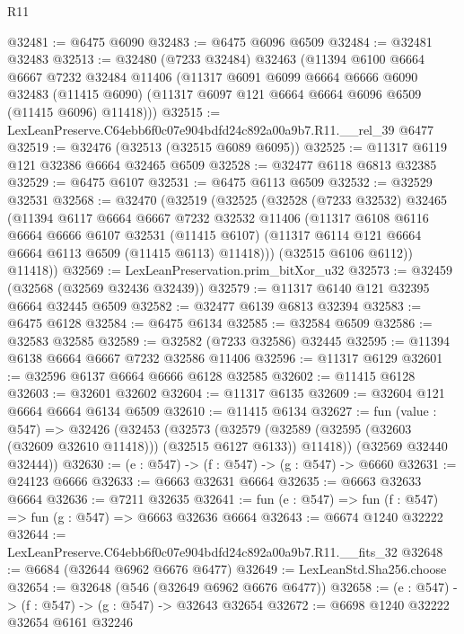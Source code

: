 \begin{lexlean}{R11}
\begin{coremodule}
@32481 := @6475 @6090
@32483 := @6475 @6096 @6509
@32484 := @32481 @32483
@32513 := @32480
    (@7233 @32484)
    @32463
    (@11394
      @6100
      @6664
      @6667
      @7232
      @32484
      @11406
      (@11317
        @6091
        @6099
        @6664
        @6666
        @6090
        @32483
        (@11415 @6090)
        (@11317 @6097 @121 @6664 @6664 @6096 @6509 (@11415 @6096) @11418)))
@32515 := LexLeanPreserve.C64ebb6f0c07e904bdfd24c892a00a9b7.R11.__rel_39 @6477
@32519 := @32476 (@32513 (@32515 @6089 @6095))
@32525 := @11317 @6119 @121 @32386 @6664 @32465 @6509
@32528 := @32477 @6118 @6813 @32385
@32529 := @6475 @6107
@32531 := @6475 @6113 @6509
@32532 := @32529 @32531
@32568 := @32470
    (@32519
      (@32525
        (@32528
          (@7233 @32532)
          @32465
          (@11394
            @6117
            @6664
            @6667
            @7232
            @32532
            @11406
            (@11317
              @6108
              @6116
              @6664
              @6666
              @6107
              @32531
              (@11415 @6107)
              (@11317 @6114 @121 @6664 @6664 @6113 @6509 (@11415 @6113) @11418)))
          (@32515 @6106 @6112))
        @11418))
@32569 := LexLeanPreservation.prim_bitXor_u32
@32573 := @32459 (@32568 (@32569 @32436 @32439))
@32579 := @11317 @6140 @121 @32395 @6664 @32445 @6509
@32582 := @32477 @6139 @6813 @32394
@32583 := @6475 @6128
@32584 := @6475 @6134
@32585 := @32584 @6509
@32586 := @32583 @32585
@32589 := @32582 (@7233 @32586) @32445
@32595 := @11394 @6138 @6664 @6667 @7232 @32586 @11406
@32596 := @11317 @6129
@32601 := @32596 @6137 @6664 @6666 @6128 @32585
@32602 := @11415 @6128
@32603 := @32601 @32602
@32604 := @11317 @6135
@32609 := @32604 @121 @6664 @6664 @6134 @6509
@32610 := @11415 @6134
@32627 := fun (value : @547) =>
  @32426
    (@32453
      (@32573
        (@32579 (@32589 (@32595 (@32603 (@32609 @32610 @11418))) (@32515 @6127 @6133)) @11418))
      (@32569 @32440 @32444))
@32630 := (e : @547) -> (f : @547) -> (g : @547) -> @6660
@32631 := @24123 @6666
@32633 := @6663 @32631 @6664
@32635 := @6663 @32633 @6664
@32636 := @7211 @32635
@32641 := fun (e : @547) => fun (f : @547) => fun (g : @547) => @6663 @32636 @6664
@32643 := @6674 @1240 @32222
@32644 := LexLeanPreserve.C64ebb6f0c07e904bdfd24c892a00a9b7.R11.__fits_32
@32648 := @6684 (@32644 @6962 @6676 @6477)
@32649 := LexLeanStd.Sha256.choose
@32654 := @32648 (@546 (@32649 @6962 @6676 @6477))
@32658 := (e : @547) -> (f : @547) -> (g : @547) -> @32643 @32654
@32672 := @6698
    @1240
    @32222
    @32654
    @6161
    @32246

\end{coremodule}
\end{lexlean}
